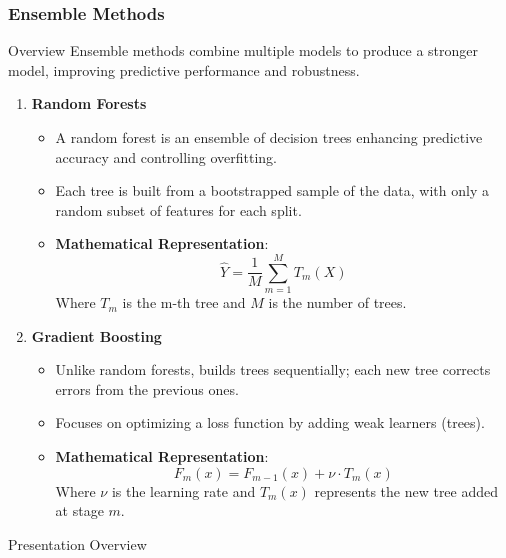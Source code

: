\documentclass[aspectratio=169]{beamer}
\begin{document}
\begin{frame}[fragile]
    \frametitle{Ensemble Methods}
    \begin{block}{Overview}
        Ensemble methods combine multiple models to produce a stronger model, improving predictive performance and robustness.
    \end{block}

    \begin{enumerate}
        \item \textbf{Random Forests}
        \begin{itemize}
            \item A random forest is an ensemble of decision trees enhancing predictive accuracy and controlling overfitting.
            \item Each tree is built from a bootstrapped sample of the data, with only a random subset of features for each split.
            \item \textbf{Mathematical Representation}:
            \begin{equation}
            \hat{Y} = \frac{1}{M} \sum_{m=1}^{M} T_m(X)
            \end{equation}
            Where \( T_m \) is the m-th tree and \( M \) is the number of trees.
        \end{itemize}
        
        \item \textbf{Gradient Boosting}
        \begin{itemize}
            \item Unlike random forests, builds trees sequentially; each new tree corrects errors from the previous ones.
            \item Focuses on optimizing a loss function by adding weak learners (trees).
            \item \textbf{Mathematical Representation}:
            \begin{equation}
            F_{m}(x) = F_{m-1}(x) + \nu \cdot T_m(x)
            \end{equation}
            Where \( \nu \) is the learning rate and \( T_m(x) \) represents the new tree added at stage \( m \).
        \end{itemize}
    \end{enumerate}
\end{frame}

\begin{frame}[fragile]{Presentation Overview}
  \tableofcontents[hideallsubsections]
\end{frame}
\end{document}
